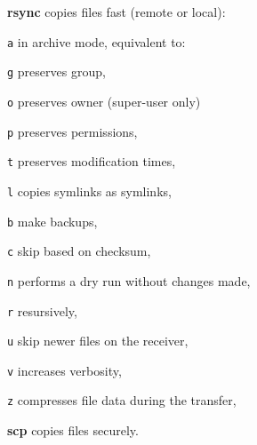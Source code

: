 \begin{compactenum}
\item [\cmdvar] \textbf{rsync} copies files fast (remote or local):
\item [\texttt{a}] in archive mode, equivalent to:
\item [\texttt{g}] preserves group,
\item [\texttt{o}] preserves owner (super-user only)
\item [\texttt{p}] preserves permissions,
\item [\texttt{t}] preserves modification times,
\item [\texttt{l}] copies symlinks as symlinks,
\item [\texttt{b}] make backups, 
\item [\texttt{c}] skip based on checksum, 
\item [\texttt{n}] performs a dry run without changes made, 
\item [\texttt{r}] resursively,  %
\item [\texttt{u}] skip newer files on the receiver, 
\item [\texttt{v}] increases verbosity, %
\item [\texttt{z}] compresses file data during the transfer, %
\item [\cmdvar] \textbf{scp} copies files securely.
\end{compactenum}